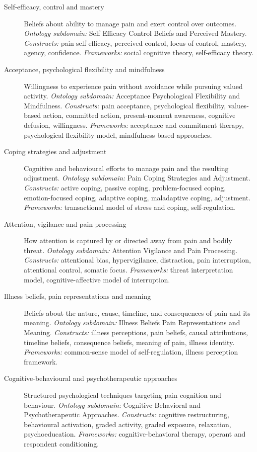 \documentclass[11pt]{article}
\begin{document}
\begin{description}
\item[Self-efficacy, control and mastery] Beliefs about ability to manage pain and exert control over outcomes.
{\small \textit{Ontology subdomain:} Self Efficacy Control Beliefs and Perceived Mastery. \textit{Constructs:} pain self-efficacy, perceived control, locus of control, mastery, agency, confidence. \textit{Frameworks:} social cognitive theory, self-efficacy theory.}
\item[Acceptance, psychological flexibility and mindfulness] Willingness to experience pain without avoidance while pursuing valued activity.
{\small \textit{Ontology subdomain:} Acceptance Psychological Flexibility and Mindfulness. \textit{Constructs:} pain acceptance, psychological flexibility, values-based action, committed action, present-moment awareness, cognitive defusion, willingness. \textit{Frameworks:} acceptance and commitment therapy, psychological flexibility model, mindfulness-based approaches.}
\item[Coping strategies and adjustment] Cognitive and behavioural efforts to manage pain and the resulting adjustment.
{\small \textit{Ontology subdomain:} Pain Coping Strategies and Adjustment. \textit{Constructs:} active coping, passive coping, problem-focused coping, emotion-focused coping, adaptive coping, maladaptive coping, adjustment. \textit{Frameworks:} transactional model of stress and coping, self-regulation.}
\item[Attention, vigilance and pain processing] How attention is captured by or directed away from pain and bodily threat.
{\small \textit{Ontology subdomain:} Attention Vigilance and Pain Processing. \textit{Constructs:} attentional bias, hypervigilance, distraction, pain interruption, attentional control, somatic focus. \textit{Frameworks:} threat interpretation model, cognitive-affective model of interruption.}
\item[Illness beliefs, pain representations and meaning] Beliefs about the nature, cause, timeline, and consequences of pain and its meaning.
{\small \textit{Ontology subdomain:} Illness Beliefs Pain Representations and Meaning. \textit{Constructs:} illness perceptions, pain beliefs, causal attributions, timeline beliefs, consequence beliefs, meaning of pain, illness identity. \textit{Frameworks:} common-sense model of self-regulation, illness perception framework.}
\item[Cognitive-behavioural and psychotherapeutic approaches] Structured psychological techniques targeting pain cognition and behaviour.
{\small \textit{Ontology subdomain:} Cognitive Behavioral and Psychotherapeutic Approaches. \textit{Constructs:} cognitive restructuring, behavioural activation, graded activity, graded exposure, relaxation, psychoeducation. \textit{Frameworks:} cognitive-behavioral therapy, operant and respondent conditioning.}

\end{description}
\end{document}
